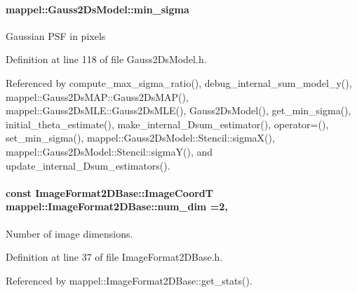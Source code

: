 \paragraph[{\texorpdfstring{min\+\_\+sigma}{min_sigma}}]{ mappel\+::\+Gauss2\+Ds\+Model\+::min\+\_\+sigma\hspace{0.3cm}{\ttfamily [protected]}}\hypertarget{classmappel_1_1Gauss2DsModel_a8a97d37d210c1d161e4bc32c3a7b20dc}{}\label{classmappel_1_1Gauss2DsModel_a8a97d37d210c1d161e4bc32c3a7b20dc}
Gaussian P\+SF in pixels 

Definition at line 118 of file Gauss2\+Ds\+Model.\+h.



Referenced by compute\+\_\+max\+\_\+sigma\+\_\+ratio(), debug\+\_\+internal\+\_\+sum\+\_\+model\+\_\+y(), mappel\+::\+Gauss2\+Ds\+M\+A\+P\+::\+Gauss2\+Ds\+M\+A\+P(), mappel\+::\+Gauss2\+Ds\+M\+L\+E\+::\+Gauss2\+Ds\+M\+L\+E(), Gauss2\+Ds\+Model(), get\+\_\+min\+\_\+sigma(), initial\+\_\+theta\+\_\+estimate(), make\+\_\+internal\+\_\+Dsum\+\_\+estimator(), operator=(), set\+\_\+min\+\_\+sigma(), mappel\+::\+Gauss2\+Ds\+Model\+::\+Stencil\+::sigma\+X(), mappel\+::\+Gauss2\+Ds\+Model\+::\+Stencil\+::sigma\+Y(), and update\+\_\+internal\+\_\+Dsum\+\_\+estimators().

\paragraph[{\texorpdfstring{num\+\_\+dim}{num_dim}}]{\setlength{\rightskip}{0pt plus 5cm}const {\bf Image\+Format2\+D\+Base\+::\+Image\+CoordT} mappel\+::\+Image\+Format2\+D\+Base\+::num\+\_\+dim =2\hspace{0.3cm}{\ttfamily [static]}, {\ttfamily [inherited]}}\hypertarget{classmappel_1_1ImageFormat2DBase_a9c29fcaf30faffc77b41ba556ebb0127}{}\label{classmappel_1_1ImageFormat2DBase_a9c29fcaf30faffc77b41ba556ebb0127}
Number of image dimensions. 

Definition at line 37 of file Image\+Format2\+D\+Base.\+h.



Referenced by mappel\+::\+Image\+Format2\+D\+Base\+::get\+\_\+stats().

